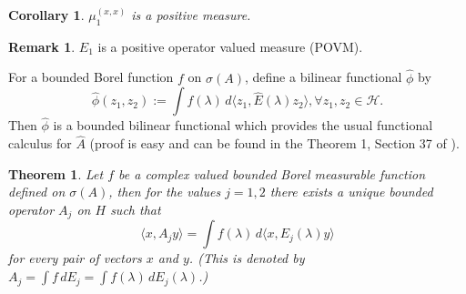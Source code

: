 \documentclass[12pt,a4paper,twoside]{article}
\numberwithin{equation}{section}
\theoremstyle{definition}  %
\newtheorem{rmk}[defn]{Remark}
\theoremstyle{plain}  %
\newtheorem{thm}[defn]{Theorem}
\newtheorem{cor}[defn]{Corollary}
\theoremstyle{remark} %
\begin{document}
\begin{cor}
$\mu_1^{(x,x)}$ is a positive measure. 
\end{cor}
\begin{rmk}
$E_1$ is a positive operator valued measure (POVM).
\end{rmk}
For a bounded Borel function $f$  on $\sigma(A)$, define a bilinear functional $\hat{\phi}$ by $$\hat{\phi}(z_{1}, z_{2}) := \int \! f(\lambda) \,d\langle z_{1}, \hat{E}(\lambda)z_{2}\rangle, \forall z_{1},z_{2} \in \mathcal{H}.$$
 Then $\hat{\phi}$ is a bounded bilinear functional which provides the usual functional calculus for $\hat{A}$ (proof is easy and can be found in the Theorem 1, Section 37 of \cite{Hal98}).
\begin{thm}\label{thm:fnl-cal}
Let $f$ be a complex valued bounded Borel measurable function defined on $\sigma(A)$, then for the values $j=1,2$ there exists a unique bounded operator $A_{j}$ on $H$ such that
\begin{equation} \label{eq:fnl-cal}
 \langle x, A_{j}y\rangle = \int\! f(\lambda) \,d\langle x, E_{j}(\lambda)y\rangle
\end{equation}
for every pair of vectors $x$ and $y$. (This is denoted by $A_{j} = \int\! f \,dE_{j}= \int\! f(\lambda) \,dE_{j}(\lambda)$.)
\end{thm}
\end{document}
